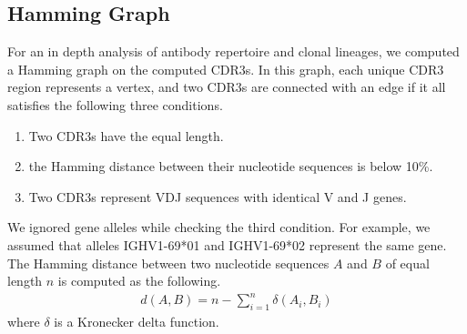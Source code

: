 \documentclass{article}
\begin{document}
\subsection{Hamming Graph}
For an in depth analysis of antibody repertoire and clonal lineages, we computed a Hamming graph on the computed CDR3s. In this graph, each unique CDR3 region represents a vertex, and two CDR3s are connected with an edge if it all satisfies the following three conditions.
\begin{enumerate}
    \item Two CDR3s have the equal length.
    \item the Hamming distance between their nucleotide sequences is below 10\%.
    \item Two CDR3s represent VDJ sequences with identical V and J genes.
\end{enumerate}
We ignored gene alleles while checking the third condition. For example, we assumed that alleles IGHV1-69*01 and IGHV1-69*02 represent the same gene. The Hamming distance between two nucleotide sequences $A$ and $B$ of equal length $n$ is computed as the following.
\begin{align}
    d(A,B) = n -\sum_{i=1}^n \delta(A_i,B_i)
\end{align}
where $\delta$ is a Kronecker delta function.
\end{document}
